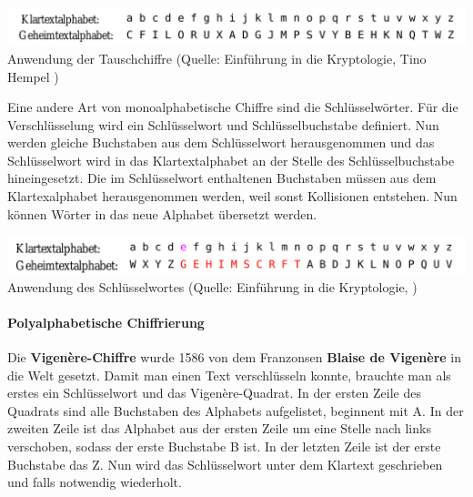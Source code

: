 \documentclass[12pt,a4paper]{report}
\begin{document}
\begin{onehalfspace}
\begin{center}
\includegraphics[scale=0.35]{img/tauschchiffre.png}\\
Anwendung der Tauschchiffre (Quelle: Einführung in die Kryptologie, Tino Hempel \cite{krypto01})
\end{center}

Eine andere Art von monoalphabetische Chiffre sind die Schlüsselwörter. Für die Verschlüsselung wird ein Schlüsselwort und Schlüsselbuchstabe definiert. Nun werden gleiche Buchstaben aus dem Schlüsselwort herausgenommen und das Schlüsselwort wird in das Klartextalphabet an der Stelle des Schlüsselbuchstabe hineingesetzt. Die im Schlüsselwort enthaltenen Buchstaben müssen aus dem Klartexalphabet herausgenommen werden, weil sonst Kollisionen entstehen. Nun können Wörter in das neue Alphabet übersetzt werden.

\begin{center}
\includegraphics[scale=0.38]{img/schluesselwortes.png}\\
Anwendung des Schlüsselwortes (Quelle: Einführung in die Kryptologie, \cite{krypto01})
\end{center}

\newpage
\paragraph{Polyalphabetische Chiffrierung}

Die \textbf{Vigenère-Chiffre} wurde 1586 von dem Franzonsen \textbf{Blaise de Vigenère} in die Welt gesetzt. Damit man einen Text verschlüsseln konnte, brauchte man als erstes ein Schlüsselwort und das Vigenère-Quadrat. In der ersten Zeile des Quadrats sind alle Buchstaben des Alphabets aufgelistet, beginnent mit A. In der zweiten Zeile ist das Alphabet aus der ersten Zeile um eine Stelle nach links verschoben, sodass der erste Buchstabe B ist. In der letzten Zeile ist der erste Buchstabe das Z. Nun wird das Schlüsselwort unter dem Klartext geschrieben und falls notwendig wiederholt.\\


\end{onehalfspace}
\end{document}
